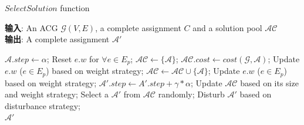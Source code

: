 \begin{algorithm}[t]
    \caption{$SelectSolution$ function}
    \label{alg:SelectSolution}
    \textbf{输入}: An ACG $\mathcal{G}(V,E)$, a complete assignment $C$ and a solution pool $\mathcal{AC}$\\
    \textbf{输出}: A complete assignment $\mathcal{A}'$
    
    \begin{algorithmic}[1] %
        \Statex \hrulefill
        \STATE $\mathcal{A}.step \leftarrow \alpha$;
            \STATE Reset $e.w$ for $\forall e \in E_p$;
            \STATE $\mathcal{AC} \leftarrow \{\mathcal{A}\}$;
            \STATE $\mathcal{AC}.cost \leftarrow cost(\mathcal{G},\mathcal{A})$;
            \STATE Update $e.w$ ($e \in E_p$) based on weight strategy;
                \STATE $\mathcal{AC} \leftarrow \mathcal{AC} \cup \{\mathcal{A}\}$;
                \STATE Update $e.w$ ($e \in E_p$) based on weight strategy;
            \ELSE
                \STATE $\mathcal{A}'.step \leftarrow A'.step + \gamma * \alpha$;
            \ENDIF
        \ENDIF
        \STATE Update $\mathcal{AC}$ based on its size and weight strategy;
        \STATE Select a $\mathcal{A}'$ from $\mathcal{AC}$ randomly;
        \STATE Disturb $\mathcal{A}'$ based on disturbance strategy;\\
        \RETURN $\mathcal{A}'$
    \end{algorithmic}
\end{algorithm}